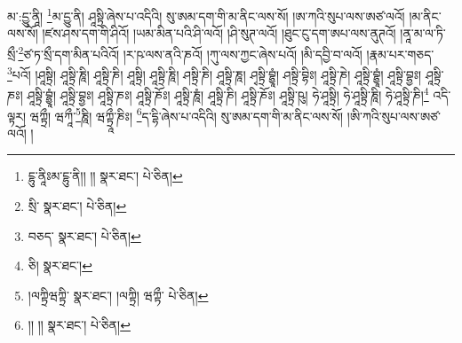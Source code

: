 མ་:དྱུ་ནཱི། \footnote{ངྷུ་ནཱིཿམ་ངྷུ་ནི།། །།   སྣར་ཐང་།  པེ་ཅིན། }མ་དྱུ་ནི། ཤཱསྟྲི་ཞེས་པ་འདིའི། སུ་ཨམ་དག་གི་མ་ནིང་ལས་སོ། །ཨ་ཀའི་སུཔ་ལས་ཨཙ་ལའོ། །མ་ནིང་ལས་སོ། །ཛས་ཤས་དག་གི་ཤིའོ། །ཡམ་མིན་པའི་ཤི་ལའོ། །ཤི་སུཊ་ལའོ། །ཐུང་ངུ་དག་ཨཔ་ལས་ནུཊའོ། །ནཱ་མ་ལ་ཏི་སྲྀ་\footnote{སྲི་  སྣར་ཐང་།  པེ་ཅིན། }ཙ་ཏ་སྲྀ་དག་མིན་པའིའོ། །ར་ཥ་ལས་ནའི་ཎའོ། །ཀུ་ལས་ཀྱང་ཞེས་པའོ། །མི་དབྱི་བ་ལའོ། །རྣམ་པར་གཅད་\footnote{བཅད་  སྣར་ཐང་།  པེ་ཅིན། }པའོ། །ཤཱསྟྲི། ཤཱསྟྲི་ཎཱི། ཤཱསྟྲི་ཎི། ཤཱསྟྲི། ཤཱསྟྲི་ཎཱི། ཤསྟྲི་ཎི། ཤཱསྟྲི་ཎཱ། ཤྭསྟྲི་བྷྱཱཾ། ཤསྟྲི་བྷིཿ། ཤཱསྟྲི་ཎེ། ཤཱསྟྲི་བྷྱཱཾ། ཤཱསྟྲི་བྷྱཿ། ཤཱསྟྲི་ཎཿ། ཤཱསྟྲི་བྷྱཱཾ། ཤཱསྟྲི་བྷྱཿ། ཤཱསྟྲི་ཎཿ། ཤཱསྟྲི་ཎོཿ། ཤཱསྟྲི་ཎཱཾ། ཤཱསྟྲི་ཎི། ཤཱསྟྲི་ཎོཿ། ཤཱསྟྲི་ཥུ། ཧེ་ཤཱསྟྲི། ཧེ་ཤཱསྟྲི་ཎཱི། ཧེ་ཤཱསྟྲི་ཎི།\footnote{ཅི།  སྣར་ཐང་། } འདི་ལྟར། ཝཀྟྲྀ། ཝཀཱྀ་\footnote{།ལཀྟྲིཝཀྟྲི་  སྣར་ཐང་། །ལཀྟྲི། ཝཀྟྀ་  པེ་ཅིན། }ཎཱི། ཝཀྟྲཱྀ་ཎིཿ། \footnote{།། །།   སྣར་ཐང་།  པེ་ཅིན། }ད་དྷི་ཞེས་པ་འདིའི། སུ་ཨམ་དག་གི་མ་ནིང་ལས་སོ། །ཨི་ཀའི་སུཔ་ལས་ཨཙ་ལའོ། །
